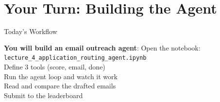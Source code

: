 \documentclass[aspectratio=169]{beamer}
\begin{document}
\section{Your Turn: Building the Agent}

\begin{frame}{Today's Workflow}


\begin{center}
\textbf{You will build an email outreach agent}:
\vspace{0.3cm}
\Large
Open the notebook: \\[0.3cm]
\texttt{lecture\_4\_application\_routing\_agent.ipynb}
\\[1cm]

Define 3 tools (score, email, done) \\[0.3cm]
Run the agent loop and watch it work \\[0.3cm]
Read and compare the drafted emails \\[0.3cm]
Submit to the leaderboard
\end{center}
\end{frame}
\end{document}

